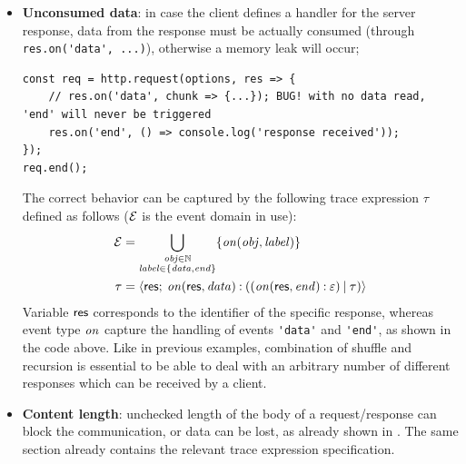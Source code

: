 \begin{itemize}
	\item \textbf{Unconsumed data}: in case the client defines a handler for the server response, data from the response must be actually consumed (through \lstinline|res.on('data', ...)|), otherwise a memory leak will occur;
	\begin{lstlisting}[belowskip=-3em]
const req = http.request(options, res => {
	// res.on('data', chunk => {...}); BUG! with no data read, 'end' will never be triggered
	res.on('end', () => console.log('response received'));
});
req.end();
	\end{lstlisting}
	The correct behavior can be captured by the following trace expression $\tau$ defined as follows (\(\mathcal{E}\) is the event domain in use):
	\begin{align*}
		\mathcal{E} &= \bigcup_{
				\substack{
					\mathit{obj} \in \mathbb{N}\\
					\mathit{label} \in \{ \mathit{data}, \mathit{end} \}
				}
			}
			\{ \mathit{on}(\mathit{obj}, \mathit{label}) \} \\
		\tau &= {\langle}\mathsf{res};\:{\mathit{on}(\mathsf{res}, \mathit{data}) \mathbin{:} ((\mathit{on}(\mathsf{res}, \mathit{end}) \mathbin{:} \varepsilon) \mathbin{|} \tau)}{\rangle}
	\end{align*}
	Variable \(\mathsf{res}\) corresponds to the identifier of the specific response, whereas event type \(\mathit{on}\) capture the handling of events \lstinline{'data'} and \lstinline{'end'}, as shown in the code above.
	Like in previous examples, combination of shuffle and recursion is essential to be able to deal with an arbitrary number of different responses which can be received by a client.
	\item \textbf{Content length}: unchecked length of the body of a request/response can block the communication, or data can be lost, as already shown in .
	The same section already contains the relevant trace expression specification.
\end{itemize}

